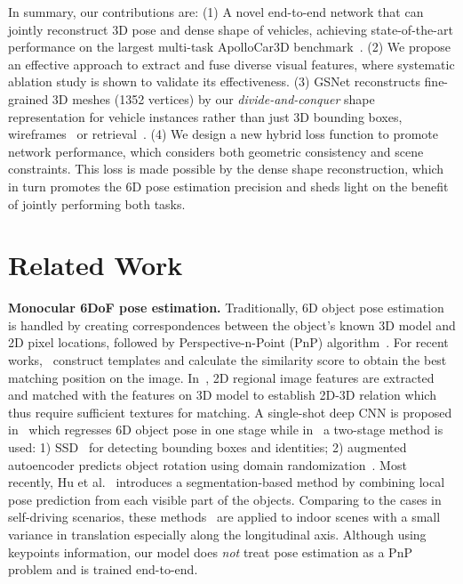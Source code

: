 \documentclass[runningheads]{llncs}
\begin{document}
In summary, our contributions are:
(1) A novel end-to-end network that can jointly reconstruct 3D pose and dense shape of vehicles, achieving state-of-the-art performance on the largest multi-task ApolloCar3D benchmark~\cite{song2019apollocar3d}.
(2) We propose an effective approach to extract and fuse diverse visual features, where systematic ablation study is shown to validate its effectiveness.
(3) GSNet reconstructs fine-grained 3D meshes (1352 vertices) by our \textit{divide-and-conquer} shape representation for vehicle instances rather than just 3D bounding boxes, wireframes~\cite{zia2013detailed} or retrieval~\cite{chabot2017deep,song2019apollocar3d}. 
(4) We design a new hybrid loss function to promote network performance, which considers both geometric consistency and scene constraints. This loss is made possible by the dense shape reconstruction, which in turn promotes the 6D pose estimation precision and sheds light on the benefit of jointly performing both tasks.
 

\section{Related Work}
\smallskip\noindent\textbf{Monocular 6DoF pose estimation.}
Traditionally, 6D object pose estimation is handled by creating correspondences between the object’s known 3D model and 2D pixel locations, followed by Perspective-n-Point (PnP) algorithm~\cite{rothganger20063d,wagner2008pose,peng2019pvnet}. 
For recent works,~\cite{cao2016real,hinterstoisser2011gradient} construct templates and calculate the similarity score to obtain the best matching position on the image. In~\cite{pavlakos20176,rothganger20063d,xiang2017posecnn}, 2D regional image features are extracted and matched with the features on 3D model to establish 2D-3D relation which thus require sufficient textures for matching.
A single-shot deep CNN is proposed in~\cite{tekin2018real} which regresses 6D object pose in one stage while in~\cite{sundermeyer2018implicit} a two-stage method is used: 1) SSD~\cite{liu2016ssd} for detecting bounding boxes and identities; 2) augmented autoencoder predicts object rotation using domain randomization~\cite{tobin2017domain}.
Most recently, Hu et al.~\cite{hu2019segmentation} introduces a segmentation-based method by combining local pose prediction from each visible part of the objects.
Comparing to the cases in self-driving scenarios, these methods~\cite{kehl2017ssd,xiang2017posecnn,rad2017bb8} are applied to indoor scenes with a small variance in translation especially along the longitudinal axis.
Although using keypoints information, our model does \textit{not} treat pose estimation as a PnP problem and is trained end-to-end.
\end{document}
